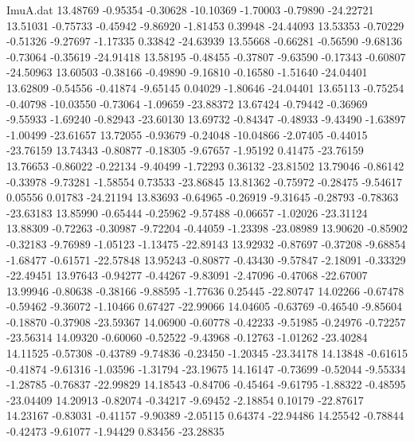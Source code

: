 \begin{filecontents}{ImuA.dat}
  13.48769   -0.95354   -0.30628  -10.10369   -1.70003   -0.79890  -24.22721
  13.51031   -0.75733   -0.45942   -9.86920   -1.81453    0.39948  -24.44093
  13.53353   -0.70229   -0.51326   -9.27697   -1.17335    0.33842  -24.63939
  13.55668   -0.66281   -0.56590   -9.68136   -0.73064   -0.35619  -24.91418
  13.58195   -0.48455   -0.37807   -9.63590   -0.17343   -0.60807  -24.50963
  13.60503   -0.38166   -0.49890   -9.16810   -0.16580   -1.51640  -24.04401
  13.62809   -0.54556   -0.41874   -9.65145    0.04029   -1.80646  -24.04401
  13.65113   -0.75254   -0.40798  -10.03550   -0.73064   -1.09659  -23.88372
  13.67424   -0.79442   -0.36969   -9.55933   -1.69240   -0.82943  -23.60130
  13.69732   -0.84347   -0.48933   -9.43490   -1.63897   -1.00499  -23.61657
  13.72055   -0.93679   -0.24048  -10.04866   -2.07405   -0.44015  -23.76159
  13.74343   -0.80877   -0.18305   -9.67657   -1.95192    0.41475  -23.76159
  13.76653   -0.86022   -0.22134   -9.40499   -1.72293    0.36132  -23.81502
  13.79046   -0.86142   -0.33978   -9.73281   -1.58554    0.73533  -23.86845
  13.81362   -0.75972   -0.28475   -9.54617    0.05556    0.01783  -24.21194
  13.83693   -0.64965   -0.26919   -9.31645   -0.28793   -0.78363  -23.63183
  13.85990   -0.65444   -0.25962   -9.57488   -0.06657   -1.02026  -23.31124
  13.88309   -0.72263   -0.30987   -9.72204   -0.44059   -1.23398  -23.08989
  13.90620   -0.85902   -0.32183   -9.76989   -1.05123   -1.13475  -22.89143
  13.92932   -0.87697   -0.37208   -9.68854   -1.68477   -0.61571  -22.57848
  13.95243   -0.80877   -0.43430   -9.57847   -2.18091   -0.33329  -22.49451
  13.97643   -0.94277   -0.44267   -9.83091   -2.47096   -0.47068  -22.67007
  13.99946   -0.80638   -0.38166   -9.88595   -1.77636    0.25445  -22.80747
  14.02266   -0.67478   -0.59462   -9.36072   -1.10466    0.67427  -22.99066
  14.04605   -0.63769   -0.46540   -9.85604   -0.18870   -0.37908  -23.59367
  14.06900   -0.60778   -0.42233   -9.51985   -0.24976   -0.72257  -23.56314
  14.09320   -0.60060   -0.52522   -9.43968   -0.12763   -1.01262  -23.40284
  14.11525   -0.57308   -0.43789   -9.74836   -0.23450   -1.20345  -23.34178
  14.13848   -0.61615   -0.41874   -9.61316   -1.03596   -1.31794  -23.19675
  14.16147   -0.73699   -0.52044   -9.55334   -1.28785   -0.76837  -22.99829
  14.18543   -0.84706   -0.45464   -9.61795   -1.88322   -0.48595  -23.04409
  14.20913   -0.82074   -0.34217   -9.69452   -2.18854    0.10179  -22.87617
  14.23167   -0.83031   -0.41157   -9.90389   -2.05115    0.64374  -22.94486
  14.25542   -0.78844   -0.42473   -9.61077   -1.94429    0.83456  -23.28835

\end{filecontents}
